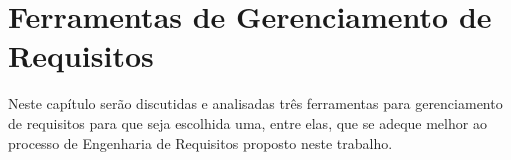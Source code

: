 \chapter[Ferramentas de Gerenciamento de Requisitos]{Ferramentas de Gerenciamento de Requisitos}
Neste capítulo serão discutidas e analisadas três ferramentas para gerenciamento de requisitos para que seja escolhida uma, entre elas, que se adeque 
melhor ao processo de Engenharia de Requisitos proposto neste trabalho.






